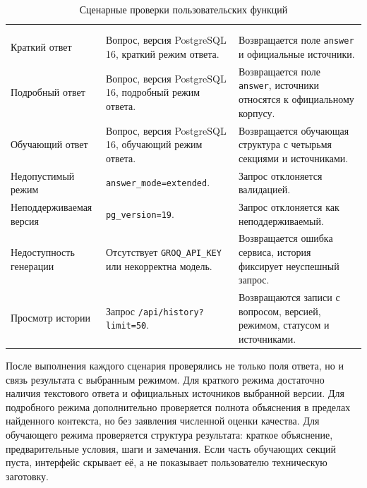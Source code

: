 \begingroup
\centering
\small
{}\selectfont
\setlength{\tabcolsep}{3pt}
\begin{longtable}{|P{0.22\textwidth}|P{0.34\textwidth}|P{0.34\textwidth}|}
\caption{Сценарные проверки пользовательских функций}\label{tab:testing-user-scenarios}\\
\hline
{} &  &  \\ \hline
\endfirsthead
{}\\
\hline
{} &  &  \\ \hline
\endhead
\endfoot
Краткий ответ & Вопрос, версия PostgreSQL 16, краткий режим ответа. & Возвращается поле \texttt{answer} и официальные источники. \\ \hline
Подробный ответ & Вопрос, версия PostgreSQL 16, подробный режим ответа. & Возвращается поле \texttt{answer}, источники относятся к официальному корпусу. \\ \hline
Обучающий ответ & Вопрос, версия PostgreSQL 16, обучающий режим ответа. & Возвращается обучающая структура с четырьмя секциями и источниками. \\ \hline
Недопустимый режим & \texttt{answer\_mode=extended}. & Запрос отклоняется валидацией. \\ \hline
Неподдерживаемая версия & \texttt{pg\_version=19}. & Запрос отклоняется как неподдерживаемый. \\ \hline
Недоступность генерации & Отсутствует \texttt{GROQ\_API\_KEY} или некорректна модель. & Возвращается ошибка сервиса, история фиксирует неуспешный запрос. \\ \hline
Просмотр истории & Запрос \texttt{/api/history?limit=50}. & Возвращаются записи с вопросом, версией, режимом, статусом и источниками. \\ \hline
\end{longtable}
\par\endgroup

После выполнения каждого сценария проверялись не только поля ответа, но и связь результата с выбранным режимом. Для краткого режима достаточно наличия текстового ответа и официальных источников выбранной версии. Для подробного режима дополнительно проверяется полнота объяснения в пределах найденного контекста, но без заявления численной оценки качества. Для обучающего режима проверяется структура результата: краткое объяснение, предварительные условия, шаги и замечания. Если часть обучающих секций пуста, интерфейс скрывает её, а не показывает пользователю техническую заготовку.


